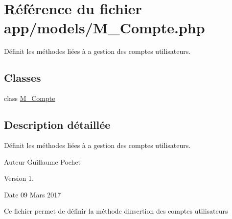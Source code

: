\hypertarget{_m___compte_8php}{}\section{Référence du fichier app/models/\+M\+\_\+\+Compte.php}
\label{_m___compte_8php}


Définit les méthodes liées à a gestion des comptes utilisateurs.  


\subsection*{Classes}
\begin{DoxyCompactItemize}
\item 
class \hyperlink{class_m___compte}{M\+\_\+\+Compte}
\end{DoxyCompactItemize}


\subsection{Description détaillée}
Définit les méthodes liées à a gestion des comptes utilisateurs. 

\begin{DoxyAuthor}{Auteur}
Guillaume Pochet 
\end{DoxyAuthor}
\begin{DoxyVersion}{Version}
1. 
\end{DoxyVersion}
\begin{DoxyDate}{Date}
09 Mars 2017
\end{DoxyDate}
Ce fichier permet de définir la méthode d\textquotesingle{}insertion des comptes utilisateurs 